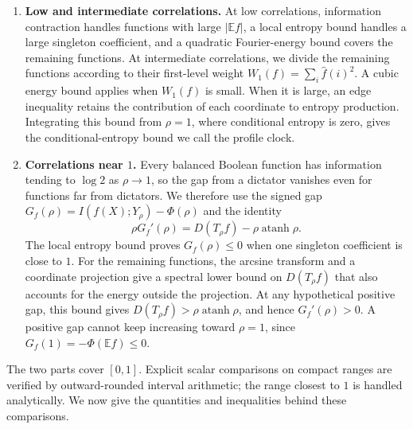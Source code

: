\documentclass[11pt,letterpaper]{amsart}
\newcommand{\E}{\mathbb E}
\newcommand{\1}{\mathbf 1}
\DeclareMathOperator{\atanh}{atanh}
\numberwithin{equation}{section}
\begin{document}
\begin{enumerate}[label=\textup{(\arabic*)},leftmargin=*]
\item \textbf{Low and intermediate correlations.}
At low correlations, information contraction handles functions with
large $|\E f|$, a local entropy bound handles a large singleton
coefficient, and a quadratic Fourier-energy bound covers the
remaining functions. At intermediate correlations, we divide the
remaining functions according to their first-level weight
$W_1(f)=\sum_i\widehat f(i)^2$. A cubic energy bound applies when
$W_1(f)$ is small. When it is large, an edge inequality retains the
contribution of each coordinate to entropy production. Integrating
this bound from $\rho=1$, where conditional entropy is zero, gives the conditional-entropy bound we call the
profile clock.

\item \textbf{Correlations near $1$.}
Every balanced Boolean function has information tending to $\log2$
as $\rho\to1$, so the gap from a dictator vanishes even for functions
far from dictators. We therefore use the signed gap
$G_f(\rho)=I(f(X);Y_\rho)-\Phi(\rho)$ and the identity
\[
 \rho G_f'(\rho)=D(T_\rho f)-\rho\atanh\rho.
\]
The local entropy bound proves $G_f(\rho)\le0$ when one singleton
coefficient is close to $1$. For the remaining functions, the
arcsine transform and a coordinate projection give a spectral lower
bound on $D(T_\rho f)$ that also accounts for the energy outside the
projection. At any hypothetical positive gap, this bound gives
$D(T_\rho f)>\rho\atanh\rho$, and hence $G_f'(\rho)>0$.
A positive gap cannot keep increasing toward $\rho=1$, since
$G_f(1)=-\Phi(\E f)\le0$.
\end{enumerate}

The two parts cover $[0,1]$. Explicit scalar comparisons on compact
ranges are verified by outward-rounded interval arithmetic; the
range closest to $1$ is handled analytically. We now give the quantities and inequalities
behind these comparisons.
\end{document}
